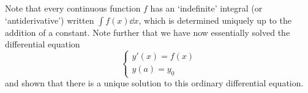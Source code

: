 \noindent Note that every continuous function \(f\) has an `indefinite' integral (or `antiderivative') written \(\int f(x)\dd{x}\), which is determined uniquely up to the addition of a constant.
Note further that we have now essentially solved the differential equation
\[
	\left\{\begin{array}{l}
		y'(x) = f(x) \\
		y(a) = y_0
	\end{array}\right.
\]
and shown that there is a unique solution to this ordinary differential equation.


